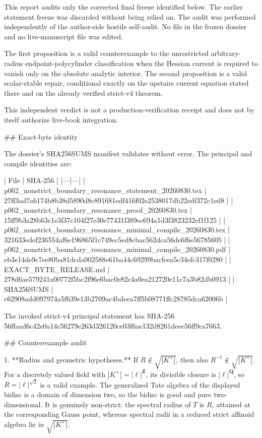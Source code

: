 This report audits only the corrected final freeze identified below. The
earlier statement freeze was discarded without being relied on. The audit
was performed independently of the author-side hostile self-audit. No file
in the frozen dossier and no live-manuscript file was edited.

The first proposition is a valid counterexample to the unrestricted
arbitrary-radius endpoint-polycylinder classification when the Hessian
current is required to vanish only on the absolute analytic interior. The
second proposition is a valid scalar-stable repair, conditional exactly on
the upstairs current equation stated there and on the already verified
strict-v4 theorem.

This independent verdict is not a production-verification receipt and does
not by itself authorize live-book integration.

## Exact-byte identity

The dossier's SHA256SUMS manifest validates without error. The principal
and compile identities are:

| File | SHA-256 |
|---|---|
| p062_nonstrict_boundary_resonance_statement_20260830.tex | 27ff3ad7a6174b8b38d5890d8c891681edf416f02e2538017db22edf372c1ed8 |
| p062_nonstrict_boundary_resonance_proof_20260830.tex | 15ff9b3a28b63c1e3f37c104f27e30e77431f389ec694a1d3f3823232ef1f125 |
| p062_nonstrict_boundary_resonance_minimal_compile_20260830.tex | 321633edef236554af6e196865f1c749ec5ed8cbac562dca56de6f6e56785605 |
| p062_nonstrict_boundary_resonance_minimal_compile_20260830.pdf | eb3e14de9c7ee80ba81dcda002588e61ba44c69299bacfeea5c34efc317f0280 |
| EXACT_BYTE_RELEASE.md | 278d6ae579241a00772f5bc2f96e6bac0e82c4a0ea212720e11c7a3b82db0913 |
| SHA256SUMS | c62908add097974a5f639e13b2709ac4bdeea7ff5b08771ffc28785dca62006b |

The invoked strict-v4 principal statement has SHA-256
56ffaad6c42e0a14c56279e263d326120ce03f6ae132d8261deee56ff9ca7663.

## Counterexample audit

1. **Radius and geometric hypotheses.** If
   \(R\notin\sqrt{|K^\times|}\), then also
   \(R^{-1}\notin\sqrt{|K^\times|}\). For a discretely valued field with
   \(|K^\times|=|\ell|^{\mathbf Z}\), its divisible closure is
   \(|\ell|^{\mathbf Q}\), so \(R=|\ell|^{\sqrt 2}\) is a valid example.
   The generalized Tate algebra of the displayed bidisc is a domain of
   dimension two, so the bidisc is good and pure two-dimensional. It is
   genuinely non-strict: the spectral radius of \(T\) is \(R\), attained at
   the corresponding Gauss point, whereas spectral radii in a reduced strict
   affinoid algebra lie in \(\sqrt{|K^\times|}\).

